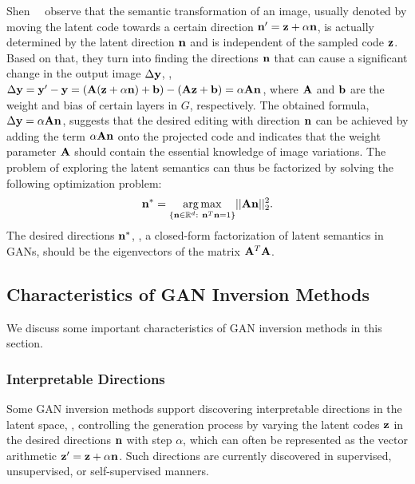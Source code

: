 Shen~\etal~\cite{shen2020closedform} observe that the semantic transformation of an image, usually denoted by moving the latent code towards a certain direction $\mathbf{n}^{\prime} = \mathbf{z} + \alpha \mathbf{n}$, is actually determined by the latent direction $\mathbf{n}$ and is independent of the sampled code $\mathbf{z}$.
Based on that, they turn into finding the directions $\mathbf{n}$ that can cause a significant change in the output image $\Delta\mathbf{y}$, \ie, $\Delta\mathbf{y} =\mathbf{y}^{\prime}-\mathbf{y}= (\mathbf{A}(\mathbf{z} + \alpha\mathbf{n}) + \mathbf{b}) - (\mathbf{A}\mathbf{z} + \mathbf{b}) = \alpha\mathbf{A}\mathbf{n}$, where $\mathbf{A}$ and $\mathbf{b}$ are the weight and bias of certain layers in $G$, respectively. 
The obtained formula, $\Delta\mathbf{y} = \alpha\mathbf{A}\mathbf{n}$, suggests that the desired editing with direction $\mathbf{n}$ can be achieved by adding the term $\alpha\mathbf{A}\mathbf{n}$ onto the projected code and indicates that the weight parameter $\mathbf{A}$ should contain the essential knowledge of image variations.
The problem of exploring the latent semantics can thus be factorized by solving the following optimization problem:
\begin{equation}
  \n^* = \underset{\{\n\in\R^d:\ \n^T\n = 1\}}{\arg\max} ||\A\n||_2^2.  
  \label{eq:single-optimization}    
\end{equation}
The desired directions $\mathbf{n}^*$, \ie, a closed-form factorization of latent semantics in GANs, should be the eigenvectors of the matrix $\mathbf{A}^T\mathbf{A}$.

\subsection{Characteristics of GAN Inversion Methods}
\label{sec:characteristics}

We discuss some important characteristics of GAN inversion methods in this section. 

\subsubsection{Interpretable Directions}
\label{sec:interpretable-directions}

Some GAN inversion methods support discovering interpretable directions in the latent space, \ie, controlling the generation process by varying the latent codes $\mathbf{z}$ in the desired directions $\mathbf{n}$ with step $\alpha$, which can often be represented as the vector arithmetic $\mathbf{z}^{\prime}=\mathbf{z}+\alpha\mathbf{n}$.
Such directions are currently discovered in supervised, unsupervised, or self-supervised manners.

